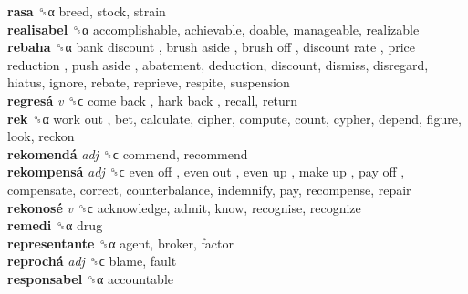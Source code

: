 \textbf{rasa} ␝α  breed, stock, strain  \\
\textbf{realisabel} ␝α  accomplishable, achievable, doable, manageable, realizable  \\
\textbf{rebaha} ␝α   bank discount ,  brush aside ,  brush off ,  discount rate ,  price reduction ,  push aside , abatement, deduction, discount, dismiss, disregard, hiatus, ignore, rebate, reprieve, respite, suspension  \\
\textbf{regresá} \emph{v}  ␝ϲ   come back ,  hark back , recall, return  \\
\textbf{rek} ␝α   work out , bet, calculate, cipher, compute, count, cypher, depend, figure, look, reckon  \\
\textbf{rekomendá} \emph{adj}  ␝ϲ  commend, recommend  \\
\textbf{rekompensá} \emph{adj}  ␝ϲ   even off ,  even out ,  even up ,  make up ,  pay off , compensate, correct, counterbalance, indemnify, pay, recompense, repair  \\
\textbf{rekonosé} \emph{v}  ␝ϲ  acknowledge, admit, know, recognise, recognize  \\
\textbf{remedi} ␝α  drug  \\
\textbf{representante} ␝α  agent, broker, factor  \\
\textbf{reprochá} \emph{adj}  ␝ϲ  blame, fault  \\
\textbf{responsabel} ␝α  accountable  \\
